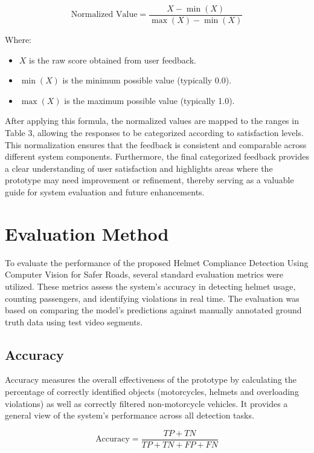 \begin{refsection}
\begin{equation}
\text{Normalized Value} = \frac{X - \min(X)}{\max(X) - \min(X)}
\end{equation}


\noindent Where:  
\begin{itemize}
    \item $X$ is the raw score obtained from user feedback.
    \item $\min(X)$ is the minimum possible value (typically 0.0).
    \item $\max(X)$ is the maximum possible value (typically 1.0).
\end{itemize}

\noindent
After applying this formula, the normalized values are mapped to the ranges in Table 3, allowing the responses to be categorized according to satisfaction levels. This normalization ensures that the feedback is consistent and comparable across different system components. Furthermore, the final categorized feedback provides a clear understanding of user satisfaction and highlights areas where the prototype may need improvement or refinement, thereby serving as a valuable guide for system evaluation and future enhancements.

\section*{Evaluation Method}
To evaluate the performance of the proposed Helmet Compliance Detection Using Computer Vision for Safer Roads, several standard evaluation metrics were utilized. These metrics assess the system’s accuracy in detecting helmet usage, counting passengers, and identifying violations in real time. The evaluation was based on comparing the model’s predictions against manually annotated ground truth data using test video segments.


\subsection*{Accuracy}

Accuracy measures the overall effectiveness of the prototype by calculating the percentage of correctly identified objects (motorcycles, helmets and overloading violations) as well as correctly filtered non-motorcycle vehicles. It provides a general view of the system’s performance across all detection tasks.

\begin{equation}
    \text{Accuracy} = \frac{TP + TN}{TP + TN + FP + FN}
\end{equation}


\end{refsection}
